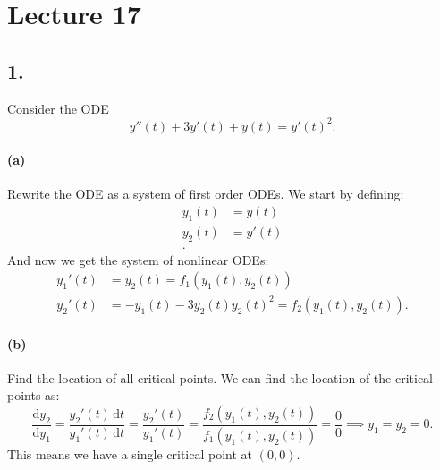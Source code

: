 \section*{Lecture 17}

\subsection*{1.} Consider the ODE
\[ 
y''(t) + 3y'(t) + y(t) = y'(t)^2
.\]

\paragraph{(a)} Rewrite the ODE as a system of first order ODEs.
\bigbreak
We start by defining:
\begin{align*}
  y_1(t) &= y(t) \\
  y_2(t) &= y'(t) \\
.\end{align*}
And now we get the system of nonlinear ODEs:
\begin{align*}
  y_1'(t) &= y_2(t) = f_1(y_1(t), y_2(t))\\
  y_2'(t) &= - y_1(t) - 3y_2(t) y_2(t)^2 = f_2 \left( y_1(t), y_2(t) \right)
.\end{align*}



\paragraph{(b)} Find the location of all critical points.
\bigbreak
We can find the location of the critical points as:
\[ 
\frac{\mathrm{d}y_2}{\mathrm{d}y_1} = \frac{y_2'(t) \, \mathrm{d}t}{y_1'(t) \, \mathrm{d}t } = \frac{y_2'(t)}{y_1'(t)} = \frac{f_2(y_1(t), y_2(t))}{f_1(y_1(t), y_2(t))} = \frac{0}{0} \implies y_1 = y_2 = 0
.\]
This means we have a single critical point at $(0,0)$.

